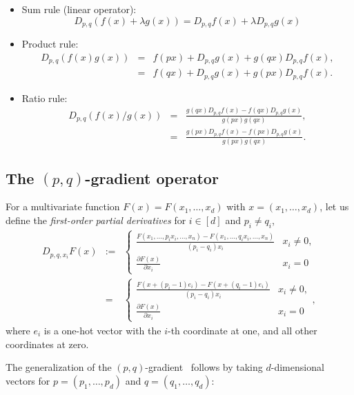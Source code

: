 \documentclass{article}
\def\eqdef{:=}
\begin{document}
\begin{itemize}
	\item Sum rule (linear operator):
	$$
	D_{p,q}(f(x)+\lambda g(x)) = D_{p,q} f(x) +  \lambda D_{p,q}g(x)
	$$
	
	\item Product rule:
	\begin{eqnarray*}
	 D_{p,q}(f(x)g(x))&=& f(px)+D_{p,q} g(x)+ g(qx)D_{p,q} f(x),\\
	&=& f(qx)+D_{p,q} g(x)+ g(px)D_{p,q} f(x).
	\end{eqnarray*}
	
	\item Ratio rule:
		\begin{eqnarray*}
	 D_{p,q}(f(x)/g(x))&=& \frac{g(qx)D_{p,q} f(x) - f(qx)D_{p,q} g(x)}{g(px)g(qx)},\\
	&=&  \frac{g(px)D_{p,q} f(x) - f(px)D_{p,q} g(x)}{g(px)g(qx)}.
	\end{eqnarray*}
\end{itemize}


 
\subsection{The $(p,q)$-gradient operator}

For a multivariate function $F(x)=F(x_1,\ldots, x_d)$ with $x=(x_1,\ldots,x_d)$, 
let us define the {\em first-order partial derivatives} for $i\in [d]$
and $p_i\not =q_i$,
\begin{eqnarray*}
D_{p,q,x_i} F(x) &\eqdef &
\left\{
\begin{array}{ll}
\frac{F(x_1,\ldots,p_i x_i,\ldots, x_n)-F(x_1,\ldots,q_i x_i,\ldots, x_n)}{(p_i-q_i)x_i} & x_i\not =0,\\
\frac{\partial F(x)}{\partial x_i} & x_i=0
\end{array}
\right.\\
&= &
\left\{
\begin{array}{ll}
\frac{F(x+(p_i-1)e_i)-F(x+(q_i-1)e_i)}{(p_i-q_i)x_i} & x_i\not =0,\\
\frac{\partial F(x)}{\partial x_i} & x_i=0
\end{array}
\right.,
\end{eqnarray*}
where $e_i$ is a one-hot vector with the $i$-th coordinate at one, and all other coordinates at zero.


The generalization of the $(p,q)$-gradient~\cite{qgrad-2013} follows by taking $d$-dimensional vectors for $p=(p_1,\ldots,p_d)$ and $q=(q_1,\ldots,q_d)$:
\end{document}
